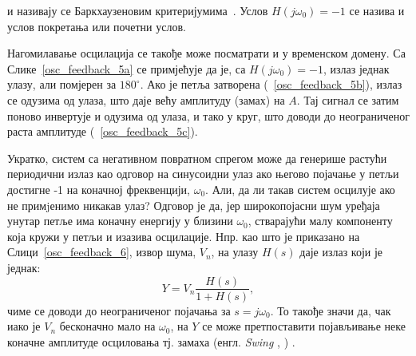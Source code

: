 \documentclass[master]{finthesis}
\makeatletter
\newcommand*{\engl}[2][\@empty]{%
    \edef\theacronym{#1}%
    (енгл. \foreignlanguage{english}{\emph{#2}%
    \ifx\theacronym\@empty \else , #1\fi})%
}
\makeatother
\begin{document}
и називају се Баркхаузеновим критеријумима~\cite{Razavi:PLL_CMOS_2020}. Услов $H(j\omega_{0})=-1$ се назива и услов покретања или почетни услов. \par
Нагомилавање осцилација се такође може посматрати и у временском домену. Са Слике~\ref{osc_feedback_5a} се примјећује да је, са $H(j\omega_{0})=-1$, излаз једнак улазу, али помјерен за $180^{\circ}$. Ако је петља затворена (\figurename~\ref{osc_feedback_5b}), излаз се одузима од улаза, што даје већу амплитуду (замах) на $A$. Тај сигнал се затим поново инвертује и одузима од улаза, и тако у круг, што доводи до неограниченог раста амплитуде (\figurename~\ref{osc_feedback_5c}). \par

Укратко, систем са негативном повратном спрегом може да генерише растући периодични излаз као одговор на синусоидни улаз ако његово појачање у петљи достигне -1 на коначној фреквенцији, $\omega_{0}$. Али, да ли такав систем осцилује ако не примjенимо никакав улаз? Одговор је да, јер широкопојасни шум уређаја унутар петље има коначну енергију у близини $\omega_{0}$, стварајући малу компоненту која кружи у петљи и изазива осцилације. Нпр. као што је приказано на Слици~\ref{osc_feedback_6}, извор шума, $V_{n}$, на улазу $H(s)$ даје излаз који је једнак:
\begin{equation} 
	\label{osc_feedback_eq_8}
	Y = V_{n}\frac{H(s)}{1+H(s)},
\end{equation}
чиме се доводи до неограниченог појачања за $s=j\omega_{0}$. То такође значи да, чак иако је $V_{n}$ бесконачно мало на $\omega_{0}$, на $Y$ се може претпоставити појављивање неке коначне амплитуде осциловања тј. замаха \engl{Swing}.

\end{document}
